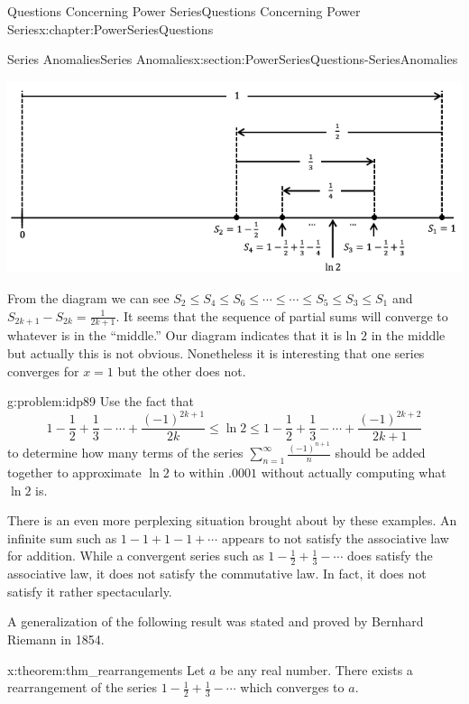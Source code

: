 \begin{chapterptx}{Questions Concerning Power Series}{}{Questions Concerning Power Series}{}{}{x:chapter:PowerSeriesQuestions}
\begin{sectionptx}{Series Anomalies}{}{Series Anomalies}{}{}{x:section:PowerSeriesQuestions-SeriesAnomalies}
		\begin{image}{0.05}{0.9}{0.05}%
			\includegraphics[width=\linewidth]{external/images/AltHarmonic.png}
		\end{image}%
		From the diagram we can see \(S_2\leq S_4\leq S_6\leq\cdots\leq\cdots\leq S_5\leq S_3\leq S_1\) and \(S_{2k+1}-S_{2k}=\frac{1}{2k+1}\). It seems that the sequence of partial sums will converge to whatever is in the ``middle.'' Our diagram indicates that it is ln \(2\) in the middle but actually this is not obvious. Nonetheless it is interesting that one series converges for \(x=1\) but the other does not.%
		\begin{problem}{}{g:problem:idp89}%
			 Use the fact that%
			\begin{equation*}
				1-\frac{1}{2}+\frac{1}{3}-\cdots+\frac{(-1)^{2k+1}}{2k}\leq\ln 2\leq 1-\frac{1}{2}+\frac{1}{3}-\cdots+\frac{(-1)^{2k+2}}{2k+1}
			\end{equation*}
			to determine how many terms of the series \(\sum_{n=1}^\infty\frac{(-1)^{n+1}}{n}\) should be added together to approximate \(\ln 2\) to within \(.0001\) without actually computing what \(\ln 2\) is.%
		\end{problem}
		There is an even more perplexing situation brought about by these examples. An infinite sum such as \(1-1+1-1+\cdots\) appears to not satisfy the associative law for addition. While a convergent series such as \(1-\frac{1}{2}+\frac{1}{3}-\cdots\) does satisfy the associative law, it does not satisfy the commutative law. In fact, it does not satisfy it rather spectacularly.%
		\par
		A generalization of the following result was stated and proved by Bernhard Riemann  in 1854.%
		\begin{theorem}{}{}{x:theorem:thm_rearrangements}%
			Let \(a\) be any real number. There exists a rearrangement of the series \(1-\frac{1}{2}+\frac{1}{3}-\cdots\) which converges to \(a\).%

\end{theorem}
\end{sectionptx}
\end{chapterptx}
